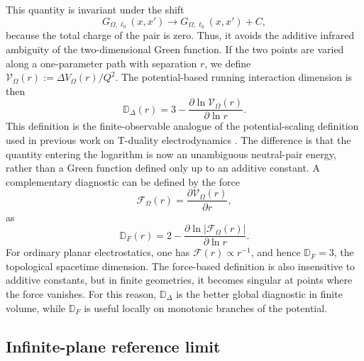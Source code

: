 \documentclass[nopacs,amsmath,amsfonts,amssymb,aps,superscriptaddress]{revtex4}
\begin{document}
This quantity is invariant under the shift
\begin{equation}
  G_{\Omega,\ell_0}(x,x')\longrightarrow G_{\Omega,\ell_0}(x,x')+C,
\end{equation}
because the total charge of the pair is zero. Thus, it avoids the additive infrared ambiguity of the two-dimensional Green function. If the two points are varied along a one-parameter path with separation $r$, we define $\mathcal{V}_\Omega(r):=\Delta V_\Omega(r)/Q^2$. The potential-based running interaction dimension is then
\begin{equation}
  \mathbb D_\Delta(r)=3-\frac{\partial\ln \mathcal V_\Omega(r)}{\partial\ln r}.
\end{equation}
This definition is the finite-observable analogue of the potential-scaling definition used in previous work on T-duality electrodynamics \cite{GaeteNicolini2022, GaeteNicolini2026}. The difference is that the quantity entering the logarithm is now an unambiguous neutral-pair energy, rather than a Green function defined only up to an additive constant. A complementary diagnostic can be defined by the force
\begin{equation}
  \mathcal F_\Omega(r)=\frac{\partial\mathcal V_\Omega(r)}{\partial r},
\end{equation}
as
\begin{equation}
\mathbb D_F(r)=2-\frac{\partial\ln|\mathcal F_\Omega(r)|}{\partial\ln r}.
\end{equation}
For ordinary planar electrostatics, one has $\mathcal F(r)\propto r^{-1}$, and hence $\mathbb D_F=3$, the topological spacetime dimension. The force-based definition is also insensitive to additive constants, but in finite geometries, it becomes singular at points where the force vanishes. For this reason, $\mathbb D_\Delta$ is the better global diagnostic in finite volume, while $\mathbb D_F$ is useful locally on monotonic branches of the potential.

\subsection{Infinite-plane reference limit}
\label{subsec:running_dimension_infinite}
\end{document}
